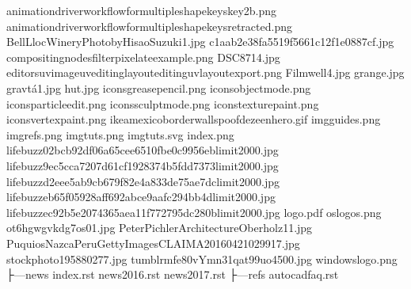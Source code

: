 \documentclass[a4paper,10pt,french]{sphinxmanual}
\begin{document}
\begin{sphinxVerbatim}[commandchars=\\\{\}]
\textbar{}       animation\PYGZus{}driver\PYGZus{}workflow\PYGZus{}for\PYGZhy{}multiple\PYGZhy{}shape\PYGZhy{}keys\PYGZhy{}key2b.png
\textbar{}       animation\PYGZus{}driver\PYGZus{}workflow\PYGZus{}for\PYGZhy{}multiple\PYGZhy{}shape\PYGZhy{}keys\PYGZhy{}retracted.png
\textbar{}       BellLlocWinery\PYGZus{}Photo\PYGZhy{}by\PYGZhy{}Hisao\PYGZhy{}Suzuki\PYGZus{}1.jpg
\textbar{}       c1aab2e38fa5519f5661c12f1e0887cf.jpg
\textbar{}       compositing\PYGZus{}nodes\PYGZus{}filter\PYGZus{}pixelate\PYGZus{}example.png
\textbar{}       DSC8714.jpg
\textbar{}       editors\PYGZus{}uv\PYGZhy{}image\PYGZus{}uv\PYGZhy{}editing\PYGZus{}layout\PYGZhy{}editing\PYGZus{}uv\PYGZhy{}layout\PYGZhy{}export.png
\textbar{}       Filmwell\PYGZhy{}4.jpg
\textbar{}       grange.jpg
\textbar{}       gravtá\PYGZus{}1.jpg
\textbar{}       hut.jpg
\textbar{}       icons\PYGZus{}grease\PYGZhy{}pencil.png
\textbar{}       icons\PYGZus{}object\PYGZhy{}mode.png
\textbar{}       icons\PYGZus{}particle\PYGZhy{}edit.png
\textbar{}       icons\PYGZus{}sculpt\PYGZhy{}mode.png
\textbar{}       icons\PYGZus{}texture\PYGZhy{}paint.png
\textbar{}       icons\PYGZus{}vertex\PYGZhy{}paint.png
\textbar{}       ikea\PYGZhy{}mexico\PYGZhy{}border\PYGZhy{}wall\PYGZhy{}spoof\PYGZus{}dezeen\PYGZus{}hero.gif
\textbar{}       img\PYGZhy{}guides.png
\textbar{}       img\PYGZhy{}refs.png
\textbar{}       img\PYGZhy{}tuts.png
\textbar{}       img\PYGZhy{}tuts.svg
\textbar{}       index.png
\textbar{}       lifebuzz\PYGZhy{}02bcb92df06a65cee6510fbe0c9956eb\PYGZhy{}limit\PYGZus{}2000.jpg
\textbar{}       lifebuzz\PYGZhy{}9ec5cca7207d61cf1928374b5fdd7373\PYGZhy{}limit\PYGZus{}2000.jpg
\textbar{}       lifebuzz\PYGZhy{}d2eee5ab9cb679f82e4a833de75ae7dc\PYGZhy{}limit\PYGZus{}2000.jpg
\textbar{}       lifebuzz\PYGZhy{}eb65f05928aff692abce9aafc294bb4d\PYGZhy{}limit\PYGZus{}2000.jpg
\textbar{}       lifebuzz\PYGZhy{}ec92b5e2074365aea11f772795dc280b\PYGZhy{}limit\PYGZus{}2000.jpg
\textbar{}       logo.pdf
\textbar{}       os\PYGZhy{}logos.png
\textbar{}       ot6hgwgvkdg7os01.jpg
\textbar{}       Peter\PYGZus{}Pichler\PYGZus{}Architecture\PYGZus{}Oberholz\PYGZus{}11.jpg
\textbar{}       Puquios\PYGZhy{}Nazca\PYGZhy{}Peru\PYGZhy{}Getty\PYGZhy{}Images\PYGZus{}CLAIMA20160421\PYGZus{}0299\PYGZus{}17.jpg
\textbar{}       stock\PYGZhy{}photo\PYGZhy{}195880277.jpg
\textbar{}       tumblr\PYGZus{}mfe80vYmn31qat99uo4\PYGZus{}500.jpg
\textbar{}       windows\PYGZhy{}logo.png
\textbar{}
├---news
\textbar{}       index.rst
\textbar{}       news\PYGZhy{}2016.rst
\textbar{}       news\PYGZhy{}2017.rst
\textbar{}
├---refs
\textbar{}   \textbar{}   autocad\PYGZhy{}faq.rst

\end{sphinxVerbatim}
\end{document}
